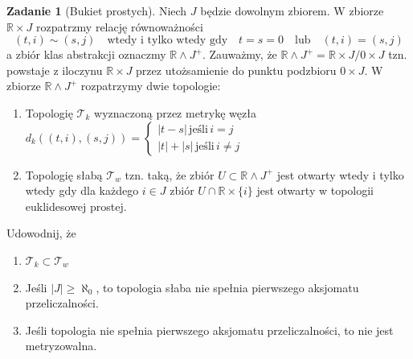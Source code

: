 \documentclass{article}
\theoremstyle{definition}%
\theoremstyle{theorem}
\newtheorem{zad}{Zadanie}
\newcommand{\R}{\mathbb{R}} %
\newcommand{\sT}{\mathcal{T}} %
\begin{document}
	\begin{zad} [Bukiet prostych] Niech $J$ będzie dowolnym zbiorem. W zbiorze $\R\times J$ rozpatrzmy relację równoważności $$(t,i)\sim (s,j)\quad\text{wtedy i tylko wtedy gdy}\quad t=s=0\quad\text{lub} \quad (t,i) = (s,j)$$ a zbiór klas abstrakcji oznaczmy  $\R\wedge J^+$. Zauważmy, że $\R\wedge J^+ = \R\times J/0\times J$ tzn. powstaje z iloczynu  $\R\times J$ przez utożsamienie do punktu podzbioru $0\times J$. W zbiorze $\R\wedge J^+$ rozpatrzymy dwie topologie:
		\begin{enumerate} 
			\item Topologię $\sT_k$ wyznaczoną przez metrykę węzła $d_k((t,i),(s,j)) = \begin{cases}  |t-s|\, \text{jeśli}\, i=j \\ |t|+|s|\, \text{jeśli}\, i\neq j\end{cases}$
			
			\item Topologię słabą $\sT_w$  tzn. taką, że zbiór $U\subset \R\wedge J^+$ jest otwarty wtedy i tylko wtedy gdy dla każdego $i\in J$ zbiór $U\cap \R\times\{i\}$ jest otwarty w topologii euklidesowej prostej. 
		\end{enumerate}
		Udowodnij, że 
		\begin{enumerate}
			\item $\sT_k\subset \sT_w$
			\item Jeśli $|J|\geq \aleph_0$, to topologia słaba nie spełnia pierwszego aksjomatu przeliczalności.
			\item Jeśli topologia nie spełnia pierwszego aksjomatu przeliczalności, to nie jest metryzowalna.
		\end{enumerate} 
		 \end{zad}
\end{document}
